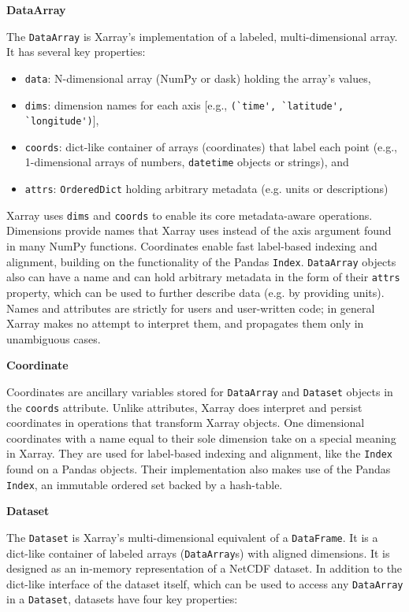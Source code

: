 \documentclass{jors}
\begin{document}
\textbf{DataArray}

The \verb|DataArray| is Xarray's implementation of a labeled, multi-dimensional array. It has several key properties:

\begin{itemize}
	\item \verb|data|: N-dimensional array (NumPy or dask) holding the array's values,
	\item \verb|dims|: dimension names for each axis [e.g., \verb|(`time', `latitude', `longitude')|],
	\item \verb|coords|: dict-like container of arrays (coordinates) that label each point (e.g., 1-dimensional arrays of numbers, \verb|datetime| objects or strings), and
	\item \verb|attrs|: \verb|OrderedDict| holding arbitrary metadata (e.g. units or descriptions)
\end{itemize}

Xarray uses \verb|dims| and \verb|coords| to enable its core metadata-aware operations.
Dimensions provide names that Xarray uses instead of the axis argument found in many NumPy functions.
Coordinates enable fast label-based indexing and alignment, building on the functionality of the Pandas \verb|Index|.
\verb|DataArray| objects also can have a name and can hold arbitrary metadata in the form of their \verb|attrs| property, which can be used to further describe data (e.g. by providing units).
Names and attributes are strictly for users and user-written code; in general Xarray makes no attempt to interpret them, and propagates them only in unambiguous cases.

\textbf{Coordinate}

Coordinates are ancillary variables stored for \verb|DataArray| and \verb|Dataset| objects in the \verb|coords| attribute.
Unlike attributes, Xarray does interpret and persist coordinates in operations that transform Xarray objects.
One dimensional coordinates with a name equal to their sole dimension take on a special meaning in Xarray.
They are used for label-based indexing and alignment, like the \verb|Index| found on a Pandas objects.
Their implementation also makes use of the Pandas \verb|Index|, an immutable ordered set backed by a hash-table.

\textbf{Dataset}

The \verb|Dataset| is Xarray's multi-dimensional equivalent of a \verb|DataFrame|. It is a dict-like container of labeled arrays (\verb|DataArray|s) with aligned dimensions.
It is designed as an in-memory representation of a NetCDF dataset.
In addition to the dict-like interface of the dataset itself, which can be used to access any \verb|DataArray| in a \verb|Dataset|, datasets have four key properties:
\end{document}
